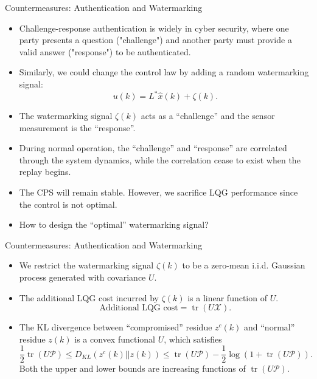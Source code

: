 \documentclass[10pt]{beamer}
\DeclareMathOperator{\tr}{tr}
\begin{document}
  \begin{frame}{Countermeasures: Authentication and Watermarking}
    \begin{itemize}
      \item Challenge-response authentication is widely in cyber security, where one party presents a question ("challenge") and another party must provide a valid answer ("response") to be authenticated.
      \item Similarly, we could change the control law by adding a random watermarking signal:
	\begin{displaymath}
	  u(k) = L^*\hat x(k) + \zeta(k).
	\end{displaymath}
      \item The watermarking signal $\zeta(k)$ acts as a ``challenge'' and the sensor measurement is the ``response''. 
      \item During normal operation, the ``challenge'' and ``response'' are correlated through the system dynamics, while the correlation cease to exist when the replay begins.
      \item The CPS will remain stable. However, we sacrifice LQG performance since the control is not optimal.
      \item How to design the ``optimal'' watermarking signal?
    \end{itemize}
  \end{frame}

  \begin{frame}{Countermeasures: Authentication and Watermarking}
    \begin{itemize}
      \item We restrict the watermarking signal $\zeta(k)$ to be a zero-mean i.i.d. Gaussian process generated with covariance $U$.
      \item The additional LQG cost incurred by $\zeta(k)$ is a linear function of $U$.
	\begin{displaymath}
	  \text{Additional LQG cost} = \tr(U\mathcal X).
	\end{displaymath}
      \item The KL divergence between ``compromised'' residue $z^c(k)$ and ``normal'' residue $z(k)$ is a convex functional $U$, which satisfies
	\begin{displaymath}
	  \frac{1}{2}\tr(U\mathcal P) \leq D_{KL}(z^c(k)||z(k))\leq \tr(U\mathcal P)-\frac{1}{2}\log(1+\tr(U\mathcal P)).
	\end{displaymath}
        Both the upper and lower bounds are increasing functions of $\tr(U\mathcal P)$.
    \end{itemize}
  \end{frame}
\end{document}
